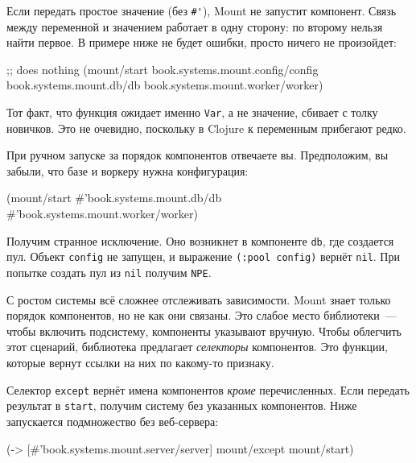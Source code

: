 Если передать простое значение (без \verb|#'|), Mount не запустит
компонент. Связь между переменной и значением работает в одну сторону: по
второму нельзя найти первое. В примере ниже не будет ошибки, просто ничего не
произойдет:

\begin{english}
  \begin{clojure}
;; does nothing
(mount/start
  book.systems.mount.config/config
  book.systems.mount.db/db
  book.systems.mount.worker/worker)
  \end{clojure}
\end{english}


Тот факт, что функция ожидает именно \verb|Var|, а не значение, сбивает с толку
новичков. Это не очевидно, поскольку в Clojure к переменным прибегают редко.

При ручном запуске за порядок компонентов отвечаете вы. Предположим, вы забыли,
что базе и воркеру нужна конфигурация:

\begin{english}
  \begin{clojure}
(mount/start
  #'book.systems.mount.db/db
  #'book.systems.mount.worker/worker)
  \end{clojure}
\end{english}

\noindent
Получим странное исключение. Оно возникнет в компоненте \verb|db|, где создается
пул. Объект \verb|config| не запущен, и выражение \verb|(:pool config)| вернёт
\verb|nil|. При попытке создать пул из \verb|nil| получим \verb|NPE|.

С ростом системы всё сложнее отслеживать зависимости. Mount знает только порядок
компонентов, но не как они связаны. Это слабое место библиотеки~--- чтобы
включить подсистему, компоненты указывают вручную. Чтобы облегчить этот
сценарий, библиотека предлагает \emph{селекторы} компонентов. Это функции,
которые вернут ссылки на них по какому-то признаку.

Селектор \verb|except| вернёт имена компонентов \emph{кроме}
перечисленных. Если передать результат в \verb|start|, получим систему без
указанных компонентов. Ниже запускается подмножество без веб-сервера:

\begin{english}
  \begin{clojure}
(-> [#'book.systems.mount.server/server]
    mount/except
    mount/start)
  \end{clojure}
\end{english}

